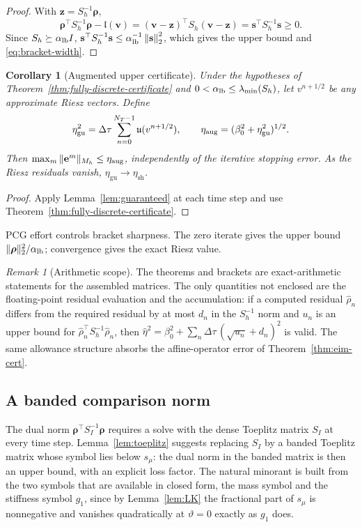 \documentclass[11pt]{amsart}
\newtheorem{corollary}[theorem]{Corollary}
\theoremstyle{remark}
\newtheorem{remark}[theorem]{Remark}
\newcommand{\Mh}{M_h}
\newcommand{\Sh}{S_h}
\newcommand{\norm}[1]{\left\lVert #1\right\rVert}
\newcommand{\dt}{\Delta\tau}
\newcommand{\etaSharp}{\eta_{\mathrm{sh}}}
\newcommand{\etaGuar}{\eta_{\mathrm{gu}}}
\newcommand{\ee}{\mathbf e}
\newcommand{\rr}{\bm\rho}
\newcommand{\vv}{\mathbf v}
\newcommand{\zz}{\mathbf z}
\newcommand{\sres}{\mathbf s}
\newcommand{\sym}[1]{#1}                 %
\begin{document}
\begin{proof}
With $\zz=\Sh^{-1}\rr$,
\[
 \rr^\top\Sh^{-1}\rr-\mathfrak l(\vv)
 = (\vv-\zz)^\top\Sh(\vv-\zz)
 = \sres^\top\Sh^{-1}\sres\ge0.
\]
Since $\Sh\succeq\alpha_{\rm lb}I$,
$\sres^\top\Sh^{-1}\sres\le
\alpha_{\rm lb}^{-1}\norm{\sres}_2^2$, which gives the upper bound and
\eqref{eq:bracket-width}.
\end{proof}
\begin{corollary}[Augmented upper certificate]
\label{cor:guaranteed}
Under the hypotheses of Theorem~\ref{thm:fully-discrete-certificate} and
$0<\alpha_{\rm lb}\le\lambda_{\min}(\Sh)$, let $v^{n+1/2}$ be any
approximate Riesz vectors. Define
\begin{equation}
 \etaGuar^2=\dt\sum_{n=0}^{N_T-1}\mathfrak u(v^{n+1/2}),
 \qquad \eta_{\rm aug}=(\beta_0^2+\etaGuar^2)^{1/2}.
 \label{eq:guaranteed-estimator}
\end{equation}
Then $\max_m\|\ee^m\|_{\Mh}\le\eta_{\rm aug}$, independently of the
iterative stopping error. As the Riesz residuals vanish,
$\etaGuar\to\etaSharp$.
\end{corollary}
\begin{proof}
Apply Lemma~\ref{lem:guaranteed} at each time step and use
Theorem~\ref{thm:fully-discrete-certificate}.
\end{proof}
PCG effort controls bracket sharpness. The zero iterate gives the upper
bound $\|\rr\|_2^2/\alpha_{\rm lb}$; convergence gives the exact Riesz value.

\begin{remark}[Arithmetic scope]
\label{rem:arithmetic-scope}
The theorems and brackets are exact-arithmetic statements for the assembled matrices.
The only quantities not enclosed are the floating-point residual evaluation and the
accumulation: if a computed residual $\widehat\rho_n$ differs from the required residual by at
most $d_n$ in the $S_h^{-1}$ norm and $u_n$ is an upper bound for
$\widehat\rho_n^\top S_h^{-1}\widehat\rho_n$, then
$\widehat\eta^2=\beta_0^2+\sum_n\dt\,(\sqrt{u_n}+d_n)^2$ is valid.  The same allowance
structure absorbs the affine-operator error of Theorem~\ref{thm:eim-cert}.
\end{remark}
\subsection{A banded comparison norm}
\label{ssec:comparison}
The dual norm $\rr^\top S_I^{-1}\rr$ requires a solve with the dense Toeplitz matrix $S_I$ at
every time step.  Lemma~\ref{lem:toeplitz} suggests replacing $S_I$ by a banded Toeplitz matrix
whose symbol lies below $\sym{s}_\mu$: the dual norm in the banded matrix is then an upper bound,
with an explicit loss factor.  The natural minorant is built from the two symbols that are
available in closed form, the mass symbol and the stiffness symbol $\sym{g}_1$, since by
Lemma~\ref{lem:LK} the fractional part of $\sym{s}_\mu$ is nonnegative and vanishes
quadratically at $\vartheta=0$ exactly as $\sym{g}_1$ does.


\end{document}
